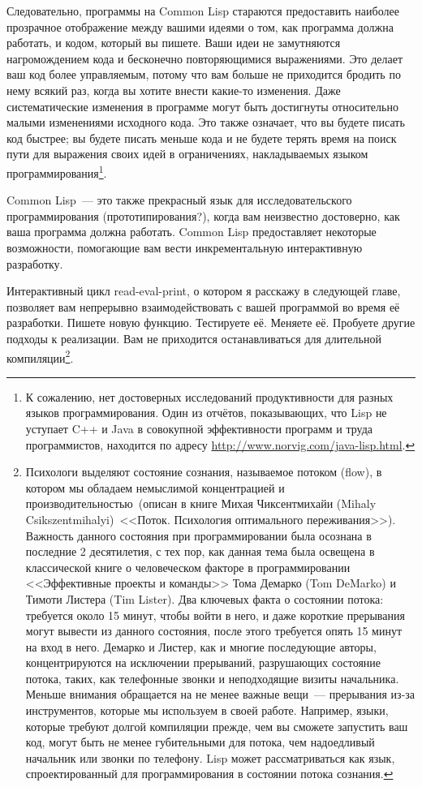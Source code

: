 Следовательно, программы на Common Lisp стараются предоставить наиболее прозрачное
отображение между вашими идеями о том, как программа должна работать, и кодом, который вы
пишете. Ваши идеи не замутняются нагромождением кода и бесконечно повторяющимися
выражениями. Это делает ваш код более управляемым, потому что вам больше не приходится
бродить по нему всякий раз, когда вы хотите внести какие-то изменения. Даже
систематические изменения в программе могут быть достигнуты относительно малыми
изменениями исходного кода. Это также означает, что вы будете писать код быстрее; вы
будете писать меньше кода и не будете терять время на поиск пути для выражения своих идей
в ограничениях, накладываемых языком программирования\footnote{К сожалению, нет
  достоверных исследований продуктивности для разных языков программирования. Один из
  отчётов, показывающих, что Lisp не уступает C++ и Java в совокупной эффективности
  программ и труда программистов, находится по адресу
  \url{http://www.norvig.com/java-lisp.html}.}.

Common Lisp~--- это также прекрасный язык для исследовательского программирования
(прототипирования?), когда вам неизвестно достоверно, как ваша программа должна
работать. Common Lisp предоставляет некоторые возможности, помогающие вам вести
инкрементальную интерактивную разработку.

Интерактивный цикл read-eval-print, о котором я расскажу в следующей главе, позволяет вам
непрерывно взаимодействовать с вашей программой во время её разработки. Пишете новую
функцию. Тестируете её. Меняете её. Пробуете другие подходы к реализации. Вам не
приходится останавливаться для длительной компиляции\footnote{Психологи выделяют состояние
  сознания, называемое потоком (flow), в котором мы обладаем немыслимой концентрацией и
  производительностью~(описан в книге Михая Чиксентмихайи (Mihaly Csikszentmihalyi)~<<Поток.
  Психология оптимального переживания>>). Важность данного состояния при программировании
  была осознана в последние 2 десятилетия, с тех пор, как данная тема была освещена в
  классической книге о человеческом факторе в программировании <<Эффективные проекты и
  команды>> Тома Демарко (Tom DeMarko) и Тимоти Листера (Tim Lister). Два ключевых факта о
  состоянии потока: требуется около 15 минут, чтобы войти в него, и даже короткие
  прерывания могут вывести из данного состояния, после этого требуется опять 15 минут на
  вход в него. Демарко и Листер, как и многие последующие авторы, концентрируются на
  исключении прерываний, разрушающих состояние потока, таких, как телефонные звонки и
  неподходящие визиты начальника. Меньше внимания обращается на не менее важные вещи~---
  прерывания из-за инструментов, которые мы используем в своей работе. Например, языки,
  которые требуют долгой компиляции прежде, чем вы сможете запустить ваш код, могут быть
  не менее губительными для потока, чем надоедливый начальник или звонки по телефону. Lisp
  может рассматриваться как язык, спроектированный для программирования в состоянии потока
  сознания.}.

